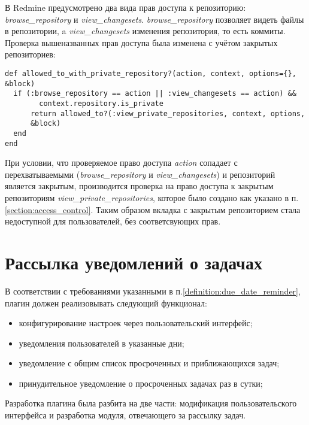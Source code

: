 В Redmine предусмотрено два вида прав доступа к репозиторию:
\textit{browse\_repository} и \textit{view\_changesets}.
\textit{browse\_repository} позволяет видеть файлы в репозитории, a
\textit{view\_changesets} изменения репозитория, то есть коммиты.
Проверка вышеназванных прав доступа была изменена с учётом закрытых
репозиториев:
\small{\begin{lstlisting}
def allowed_to_with_private_repository?(action, context, options={}, &block)
  if (:browse_repository == action || :view_changesets == action) &&
        context.repository.is_private 
      return allowed_to?(:view_private_repositories, context, options,
      &block)       
  end
end
\end{lstlisting}}
При условии, что проверяемое право доступа \textit{action} сопадает с
перехватываемыми (\textit{browse\_repository } и \textit{view\_changesets}) и
репозиторий является закрытым, производится проверка на право доступа к
закрытым репозиториям \textit{view\_private\_repositories}, которое было
создано как указано в п.\ref{section:access_control}. Таким образом
вкладка с закрытым репозиторием стала недоступной для пользователей, без
соответсвующих прав.


\section{Рассылка уведомлений о задачах}
В соответствии с требованиями указанными в
п.\ref{definition:due_date_reminder}, плагин должен реализовывать следующий
функционал:
\begin{itemize}
  \item конфигурирование настроек через пользовательский интерфейс;
  \item уведомления пользователей в указанные дни;
  \item уведомление с общим список просроченных и приближающихся задач; 
  \item принудительное уведомление о просроченных задачах раз в сутки;
\end{itemize}
Разработка плагина была разбита на две части: модификация пользовательского
интерфейса и разработка модуля, отвечающего за рассылку задач.


